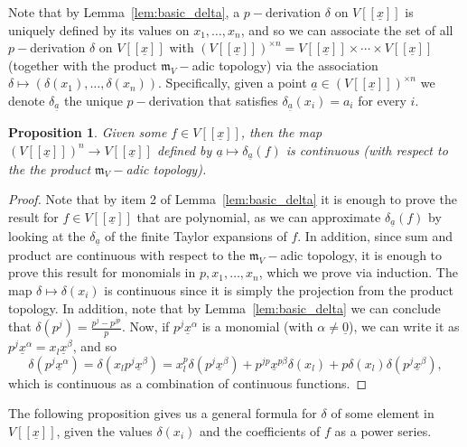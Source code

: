 \documentclass{article}
\newtheorem{proposition}[theorem]{Proposition}
\newcommand{\maxV}{\mathfrak{m}_V}
\newcommand{\Vx}{V[[\underline{x}]]}
\numberwithin{theorem}{section}
\begin{document}
Note that by Lemma~\ref{lem:basic_delta}, a $p-$derivation $\delta$ on $\Vx$ is uniquely defined by its values on $x_1, \dots, x_n$, and so we can associate the set of all $p-$derivation $\delta$ on $\Vx$ with $(\Vx)^{\times n}=V[[\underline{x}]] \times \cdots \times \Vx$ (together with the product $\maxV-$adic topology) via the association $\delta \mapsto (\delta(x_1), \dots, \delta(x_n))$. Specifically, given a point $\underline{a} \in (\Vx)^{\times n}$ we denote $\delta_{\underline{a}}$ the unique $p-$derivation that satisfies $\delta_{\underline{a}}(x_i)=a_i$ for every $i$. 


\begin{proposition}\label{prop:continuous_delta}
    Given some $f\in \Vx$, then the map $(\Vx)^n \to \Vx$ defined by $\underline{a} \mapsto \delta_{\underline{a}}(f)$ is continuous (with respect to the the product $\maxV-$adic topology).
\end{proposition}

\begin{proof}
    Note that by item 2 of Lemma~\ref{lem:basic_delta} it is enough to prove the result for $f \in \Vx$ that are polynomial, as we can approximate $\delta_{\underline{a}}(f)$ by looking at the $\delta_{\underline{a}}$ of the finite Taylor expansions of $f$. In addition, since sum and product are continuous with respect to the $\maxV-$adic topology, it is enough to prove this result for monomials in $p, x_1, \dots, x_n$, which we prove via induction. The map $\delta \mapsto \delta(x_i)$ is continuous since it is simply the projection from the product topology. In addition, note that by Lemma~\ref{lem:basic_delta} we can conclude that $\delta(p^j)=\frac{p^j-p^{jp}}{p}$. Now, if $p^j\underline{x}^{\alpha}$ is a monomial (with $\alpha \neq \underline{0}$), we can write it as $p^j\underline{x}^{\alpha}=x_l \underline{x}^{\beta}$, and so 
    \begin{equation*}
    \delta(p^j\underline{x}^\alpha)=\delta(x_l p^j\underline{x}^\beta) = x_l^p \delta(p^j\underline{x}^\beta) + p^{jp} \underline{x}^{p\beta} \delta(x_l) + p\delta(x_l)\delta(p^j \underline{x}^{\beta}),
    \end{equation*}
    which is continuous as a combination of continuous functions. 
\end{proof}

The following proposition gives us a general formula for $\delta$ of some element in $V[[\underline{x}]]$, given the values $\delta(x_i)$ and the coefficients of $f$ as a power series. 
\end{document}
